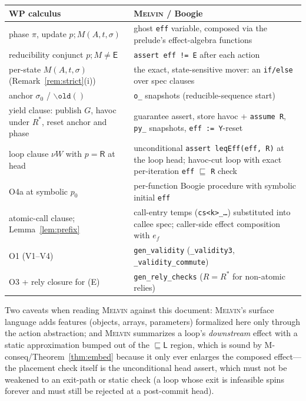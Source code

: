 \documentclass[11pt]{article}
\theoremstyle{plain}
\theoremstyle{plain}
\theoremstyle{definition}
\newcommand{\MR}{\mathsf{R}}
\newcommand{\ML}{\mathsf{L}}
\newcommand{\ME}{\mathsf{E}}
\newcommand{\sq}{\sqsubseteq}
\newcommand{\oldx}[1]{\mathtt{\backslash old}(#1)}
\newcommand{\melvin}{\textsc{Melvin}}
\newcommand{\code}[1]{\texttt{#1}}
\begin{document}
\begin{center}
\renewcommand{\arraystretch}{1.25}
\small
\begin{tabularx}{\textwidth}{@{}>{\raggedright\arraybackslash}X >{\raggedright\arraybackslash}X@{}}
\toprule
\textbf{WP calculus} & \textbf{\melvin{} / Boogie}\\
\midrule
phase $\pi$, update $p;M(A,t,\sigma)$
  & ghost \code{eff} variable, composed via the prelude's effect-algebra functions\\
reducibility conjunct $p;M\neq\ME$
  & \code{assert eff != E} after each action\\
per-state $M(A,t,\sigma)$ (Remark~\ref{rem:strict}(i))
  & the exact, state-sensitive mover: an \code{if/else} over spec clauses\\
anchor $\sigma_0$ / $\oldx{}$
  & \code{o\_} snapshots (reducible-sequence start)\\
yield clause: publish $G$, havoc under $R^*$, reset anchor and phase
  & guarantee assert, store havoc + \code{assume R}, \code{py\_} snapshots,
    \code{eff := Y}-reset\\
loop clause $\nu W$ with $p=\MR$ at head
  & unconditional \code{assert leqEff(eff, R)} at the loop head; havoc-cut loop
    with exact per-iteration \code{eff} $\sq$ \code{R} check\\
O4a at symbolic $p_0$
  & per-function Boogie procedure with symbolic initial \code{eff}\\
atomic-call clause; Lemma~\ref{lem:prefix}
  & call-entry temps (\code{cs<k>\_\dots}) substituted into callee spec;
    caller-side effect composition with $e_f$\\
O1 (V1--V4)
  & \code{gen\_validity} (\code{\_validity3}, \code{\_validity\_commute})\\
O3 + rely closure for (E)
  & \code{gen\_rely\_checks} ($R = R^*$ for non-atomic relies)\\
\bottomrule
\end{tabularx}
\end{center}

Two caveats when reading \melvin{} against this document: \melvin{}'s surface
language adds features (objects, arrays, parameters) formalized here only through
the action abstraction; and \melvin{} summarizes a loop's \emph{downstream}
effect with a static approximation bumped out of the $\sq\ML$ region, which is
sound by M-conseq/Theorem~\ref{thm:embed} because it only ever enlarges the
composed effect---the placement check itself is the unconditional head assert,
which must not be weakened to an exit-path or static check (a loop whose exit is
infeasible spins forever and must still be rejected at a post-commit head).
\end{document}
